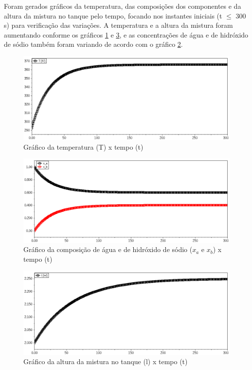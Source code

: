 \documentclass[
	12pt,				%
	openright,			%
	oneside,			%
	a4paper,			%
	english,			%
	french,				%
	spanish,			%
	brazil				%
	]{abntex2}
\begin{document}
Foram gerados gráficos da temperatura, das composições dos componentes e da altura da mistura no tanque pelo tempo, focando nos instantes iniciais (t $\leq$ 300 s) para verificação das variações. A temperatura e a altura da mistura foram aumentando conforme os gráficos \ref{Gráfico da temperatura x tempo} e \ref{Gráfico da altura x tempo}, e as concentrações de água e de hidróxido de sódio também foram variando de acordo com o gráfico \ref{Gráfico da composição dos componentes x tempo}. 

\begin{figure}[H]
\centering
\includegraphics[scale=0.4]{Plot2D (7).png} 
\caption{Gráfico da temperatura (T) x tempo (t)}
\label{Gráfico da temperatura x tempo}
\end{figure}

\begin{figure}[H]
\centering
\includegraphics[scale=0.4]{Plot2D (6).png} 
\caption{Gráfico da composição de água e de hidróxido de sódio ($x_{a}$ e $x_{b}$) x tempo (t)}
\label{Gráfico da composição dos componentes x tempo}
\end{figure}

\begin{figure}[H]
\centering
\includegraphics[scale=0.4]{Plot2D (8).png} 
\caption{Gráfico da altura da mistura no tanque (l) x tempo (t)}
\label{Gráfico da altura x tempo}
\end{figure}
\end{document}
